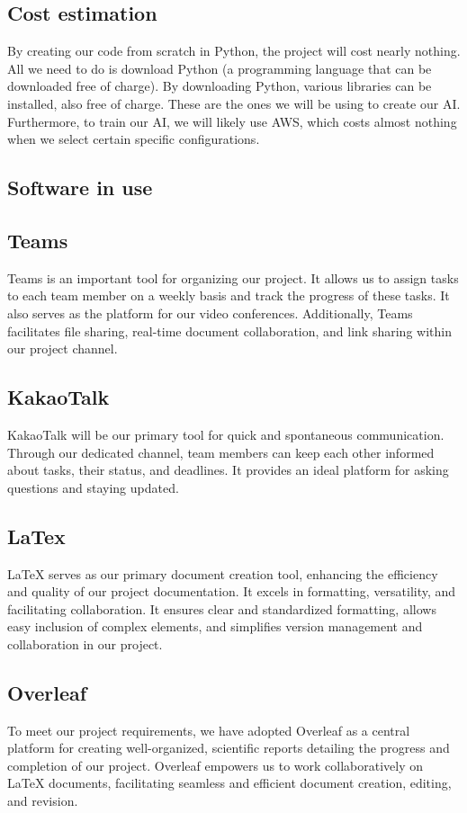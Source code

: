 \documentclass[conference]{IEEEtran}
\begin{document}
\subsection*{Cost estimation }
By creating our code from scratch in Python, the project will cost nearly nothing. All we need to do is download Python (a programming language that can be downloaded free of charge). By downloading Python, various libraries can be installed, also free of charge. These are the ones we will be using to create our AI. Furthermore, to train our AI, we will likely use AWS, which costs almost nothing when we select certain specific configurations.


\subsection{Software in use}

\subsection*{Teams}
Teams is an important tool for organizing our project. It allows us to assign tasks to each team member on a weekly basis and track the progress of these tasks. It also serves as the platform for our video conferences. Additionally, Teams facilitates file sharing, real-time document collaboration, and link sharing within our project channel.
\subsection*{KakaoTalk}
KakaoTalk will be our primary tool for quick and spontaneous communication. Through our dedicated channel, team members can keep each other informed about tasks, their status, and deadlines. It provides an ideal platform for asking questions and staying updated.
\subsection*{LaTex}
LaTeX serves as our primary document creation tool, enhancing the efficiency and quality of our project documentation. It excels in formatting, versatility, and facilitating collaboration. It ensures clear and standardized formatting, allows easy inclusion of complex elements, and simplifies version management and collaboration in our project.
\subsection*{Overleaf}
To meet our project requirements, we have adopted Overleaf as a central platform for creating well-organized, scientific reports detailing the progress and completion of our project. Overleaf empowers us to work collaboratively on LaTeX documents, facilitating seamless and efficient document creation, editing, and revision.
\end{document}
